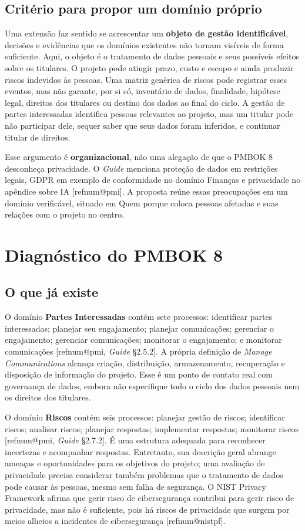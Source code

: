 \documentclass[11pt,a4paper]{article}
\makeatletter
\newcommand{\refnum}[1]{\csname refnum@#1\endcsname}
\makeatother
\begin{document}
\subsection{Critério para propor um domínio próprio}

Uma extensão faz sentido se acrescentar um \textbf{objeto de gestão identificável}, decisões e evidências que os domínios existentes não tornam visíveis de forma suficiente. Aqui, o objeto é o tratamento de dados pessoais e seus possíveis efeitos sobre os titulares. O projeto pode atingir prazo, custo e escopo e ainda produzir riscos indevidos às pessoas. Uma matriz genérica de riscos pode registrar esses eventos, mas não garante, por si só, inventário de dados, finalidade, hipótese legal, direitos dos titulares ou destino dos dados ao final do ciclo. A gestão de partes interessadas identifica pessoas relevantes ao projeto, mas um titular pode não participar dele, sequer saber que seus dados foram inferidos, e continuar titular de direitos.

Esse argumento é \textbf{organizacional}, não uma alegação de que o PMBOK 8 desconheça privacidade. O \textit{Guide} menciona proteção de dados em restrições legais, GDPR em exemplo de conformidade no domínio Finanças e privacidade no apêndice sobre IA [\refnum{pmi}]. A proposta reúne essas preocupações em um domínio verificável, situado em Quem porque coloca pessoas afetadas e suas relações com o projeto no centro.

\section{Diagnóstico do PMBOK 8}
\subsection{O que já existe}

O domínio \textbf{Partes Interessadas} contém sete processos: identificar partes interessadas; planejar seu engajamento; planejar comunicações; gerenciar o engajamento; gerenciar comunicações; monitorar o engajamento; e monitorar comunicações [\refnum{pmi}, \textit{Guide} §2.5.2]. A própria definição de \textit{Manage Communications} alcança criação, distribuição, armazenamento, recuperação e disposição de informação do projeto. Esse é um ponto de contato real com governança de dados, embora não especifique todo o ciclo dos dados pessoais nem os direitos dos titulares.

O domínio \textbf{Riscos} contém seis processos: planejar gestão de riscos; identificar riscos; analisar riscos; planejar respostas; implementar respostas; monitorar riscos [\refnum{pmi}, \textit{Guide} §2.7.2]. É uma estrutura adequada para reconhecer incertezas e acompanhar respostas. Entretanto, sua descrição geral abrange ameaças e oportunidades para os objetivos do projeto; uma avaliação de privacidade precisa considerar também problemas que o tratamento de dados pode causar às pessoas, mesmo sem falha de segurança. O NIST Privacy Framework afirma que gerir risco de cibersegurança contribui para gerir risco de privacidade, mas não é suficiente, pois há riscos de privacidade que surgem por meios alheios a incidentes de cibersegurança [\refnum{nistpf}].
\end{document}

